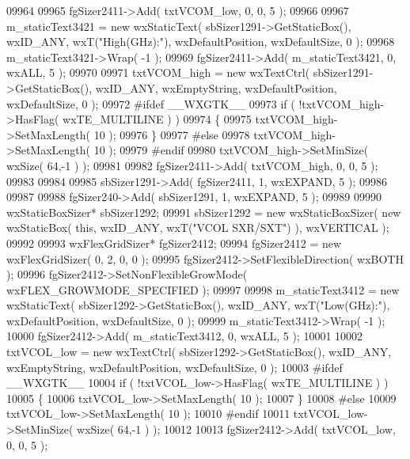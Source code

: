 \begin{DoxyCode}
09964     
09965     fgSizer2411->Add( txtVCOM_low, 0, 0, 5 );
09966     
09967     m_staticText3421 = \textcolor{keyword}{new} wxStaticText( sbSizer1291->GetStaticBox(), wxID\_ANY, wxT(\textcolor{stringliteral}{"High(GHz):"}), 
      wxDefaultPosition, wxDefaultSize, 0 );
09968     m_staticText3421->Wrap( -1 );
09969     fgSizer2411->Add( m_staticText3421, 0, wxALL, 5 );
09970     
09971     txtVCOM_high = \textcolor{keyword}{new} wxTextCtrl( sbSizer1291->GetStaticBox(), wxID\_ANY, wxEmptyString, wxDefaultPosition,
       wxDefaultSize, 0 );
09972 \textcolor{preprocessor}{    #ifdef \_\_WXGTK\_\_}
09973     \textcolor{keywordflow}{if} ( !txtVCOM_high->HasFlag( wxTE\_MULTILINE ) )
09974     \{
09975     txtVCOM_high->SetMaxLength( 10 );
09976     \}
09977 \textcolor{preprocessor}{    #else}
09978     txtVCOM_high->SetMaxLength( 10 );
09979 \textcolor{preprocessor}{    #endif}
09980     txtVCOM_high->SetMinSize( wxSize( 64,-1 ) );
09981     
09982     fgSizer2411->Add( txtVCOM_high, 0, 0, 5 );
09983     
09984     
09985     sbSizer1291->Add( fgSizer2411, 1, wxEXPAND, 5 );
09986     
09987     
09988     fgSizer240->Add( sbSizer1291, 1, wxEXPAND, 5 );
09989     
09990     wxStaticBoxSizer* sbSizer1292;
09991     sbSizer1292 = \textcolor{keyword}{new} wxStaticBoxSizer( \textcolor{keyword}{new} wxStaticBox( \textcolor{keyword}{this}, wxID\_ANY, wxT(\textcolor{stringliteral}{"VCOL SXR/SXT"}) ), wxVERTICAL 
      );
09992     
09993     wxFlexGridSizer* fgSizer2412;
09994     fgSizer2412 = \textcolor{keyword}{new} wxFlexGridSizer( 0, 2, 0, 0 );
09995     fgSizer2412->SetFlexibleDirection( wxBOTH );
09996     fgSizer2412->SetNonFlexibleGrowMode( wxFLEX\_GROWMODE\_SPECIFIED );
09997     
09998     m_staticText3412 = \textcolor{keyword}{new} wxStaticText( sbSizer1292->GetStaticBox(), wxID\_ANY, wxT(\textcolor{stringliteral}{"Low(GHz):"}), 
      wxDefaultPosition, wxDefaultSize, 0 );
09999     m_staticText3412->Wrap( -1 );
10000     fgSizer2412->Add( m_staticText3412, 0, wxALL, 5 );
10001     
10002     txtVCOL_low = \textcolor{keyword}{new} wxTextCtrl( sbSizer1292->GetStaticBox(), wxID\_ANY, wxEmptyString, wxDefaultPosition, 
      wxDefaultSize, 0 );
10003 \textcolor{preprocessor}{    #ifdef \_\_WXGTK\_\_}
10004     \textcolor{keywordflow}{if} ( !txtVCOL_low->HasFlag( wxTE\_MULTILINE ) )
10005     \{
10006     txtVCOL_low->SetMaxLength( 10 );
10007     \}
10008 \textcolor{preprocessor}{    #else}
10009     txtVCOL_low->SetMaxLength( 10 );
10010 \textcolor{preprocessor}{    #endif}
10011     txtVCOL_low->SetMinSize( wxSize( 64,-1 ) );
10012     
10013     fgSizer2412->Add( txtVCOL_low, 0, 0, 5 );

\end{DoxyCode}
